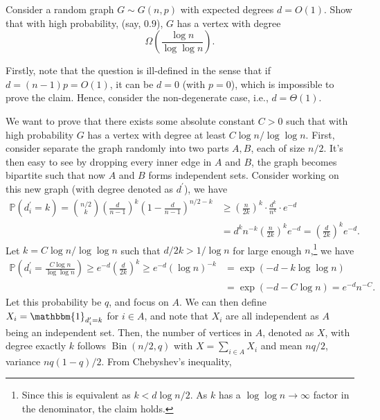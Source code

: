 \begin{problem*}[Exercise 2.4.5]\label{ex2.4.5}
	Consider a random graph \(G \sim G(n, p)\) with expected degrees \(d = O(1)\). Show that with high probability, (say, \(0.9\)), \(G\) has a vertex with degree
	\[
		\Omega \left( \frac{\log n}{\log \log n} \right) .
	\]
\end{problem*}
\begin{answer}
	Firstly, note that the question is ill-defined in the sense that if \(d = (n - 1) p = O(1)\), it can be \(d = 0\) (with \(p = 0\)), which is impossible to prove the claim. Hence, consider the non-degenerate case, i.e., \(d = \Theta (1)\).

	We want to prove that there exists some absolute constant \(C > 0\) such that with high probability \(G\) has a vertex with degree at least \(C \log n / \log \log n\). First, consider separate the graph randomly into two parts \(A, B\), each of size \(n / 2\). It's then easy to see by dropping every inner edge in \(A\) and \(B\), the graph becomes bipartite such that now \(A\) and \(B\) forms independent sets. Consider working on this new graph (with degree denoted as \(d^{\prime} \)), we have
	\[
		\begin{split}
			\mathbb{P} (d_i^{\prime} = k)
			= \binom{n / 2}{k} \left( \frac{d}{n-1} \right) ^k \left( 1 - \frac{d}{n-1} \right) ^{n / 2 - k}
			 & \geq \left( \frac{n}{2k} \right) ^k \cdot \frac{d^k}{n^k} \cdot e^{-d} \\
			 & = d^{k} n^{- k} \left( \frac{n}{2 k} \right) ^{k} e^{- d}
			= \left( \frac{d}{2k} \right) ^k e^{-d}.
		\end{split}
	\]
	Let \(k = C \log n / \log \log n\) such that \(d / 2k > 1 / \log n\) for large enough \(n\),\footnote{Since this is equivalent as \(k < d \log n / 2\). As \(k\) has a \(\log \log n \to \infty \) factor in the denominator, the claim holds.} we have
	\[
		\begin{split}
			\mathbb{P} \left( d_i^{\prime} = \frac{C \log n}{\log \log n} \right)
			\geq e^{-d} \left( \frac{d}{2k} \right) ^k
			\geq e^{-d} (\log n)^{-k}
			 & = \exp (-d - k \log \log n) \\
			 & = \exp (-d - C \log n)
			= e^{-d} n^{-C}.
		\end{split}
	\]
	Let this probability be \(q\), and focus on \(A\). We can then define \(X_i = \mathbbm{1}_{d_i^{\prime} = k} \) for \(i \in A\), and note that \(X_i\) are all independent as \(A\) being an independent set. Then, the number of vertices in \(A\), denoted as \(X\), with degree exactly \(k\) follows \(\operatorname{Bin}(n / 2, q) \) with \(X = \sum_{i\in A} X_i\) and mean \(n q / 2\), variance \(nq (1 - q) / 2\). From Chebyshev's inequality,

\end{answer}
